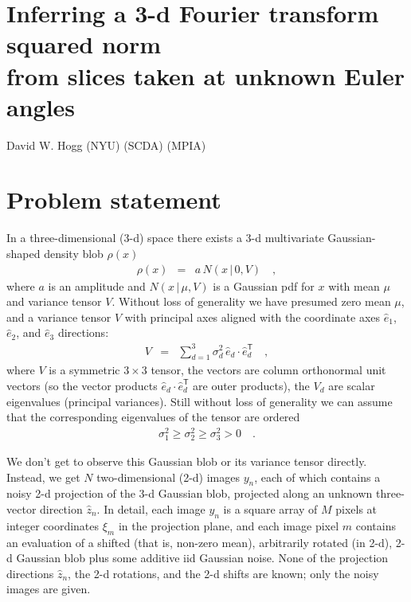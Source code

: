 \documentclass[12pt]{article}
\newcommand{\normal}{N}
\newcommand{\unitvec}[1]{\hat{#1}}
\newcommand{\ehat}{\unitvec{e}}
\newcommand{\zhat}{\unitvec{z}}
\newcommand{\transpose}{^{\mathsf{T}}}
\newcommand{\given}{\,|\,}
\begin{document}
\sloppy\sloppypar

\section*{Inferring a 3-d Fourier transform squared norm \\
          from slices taken at unknown Euler angles}
\noindent
David W. Hogg (NYU) (SCDA) (MPIA)

\bigskip

\section{Problem statement}

In a three-dimensional (3-d) space there exists a 3-d multivariate
Gaussian-shaped density blob $\rho(x)$
\begin{eqnarray}
  \rho(x) &=& a\,\normal(x\given 0, V)
  \quad ,
\end{eqnarray}
where $a$ is an amplitude and $\normal(x\given\mu, V)$ is a Gaussian
pdf for $x$ with mean $\mu$ and variance tensor $V$.
Without loss of generality we have presumed zero mean $\mu$, and a
variance tensor $V$ with principal axes aligned with the coordinate
axes $\ehat_1$, $\ehat_2$, and $\ehat_3$ directions:
\begin{eqnarray}
  V &=& \sum_{d=1}^3 \sigma^2_d \, \ehat_d\cdot\ehat_d\transpose
  \quad ,
\end{eqnarray}
where $V$ is a symmetric $3\times3$ tensor, the vectors are column
orthonormal unit vectors (so the vector products
$\ehat_d\cdot\ehat_d\transpose$ are outer products), the $V_d$ are
scalar eigenvalues (principal variances).
Still without loss of generality we can assume that the corresponding
eigenvalues of the tensor are ordered
\begin{eqnarray}
  \sigma^2_1 \geq \sigma^2_2 \geq \sigma^2_3 > 0
  \quad .
\end{eqnarray}

We don't get to observe this Gaussian blob or its variance tensor
directly.
Instead, we get $N$ two-dimensional (2-d) images $y_n$, each of which
contains a noisy 2-d projection of the 3-d Gaussian blob,
projected along an unknown three-vector direction $\zhat_n$.
In detail, each image $y_n$ is a square array of $M$ pixels at integer
coordinates $\xi_m$ in the projection plane, and each image pixel $m$
contains an evaluation of a shifted (that is, non-zero mean),
arbitrarily rotated (in 2-d), 2-d Gaussian blob plus some additive iid
Gaussian noise.
None of the projection directions $\zhat_n$, the 2-d rotations, and
the 2-d shifts are known; only the noisy images are given.
\end{document}
